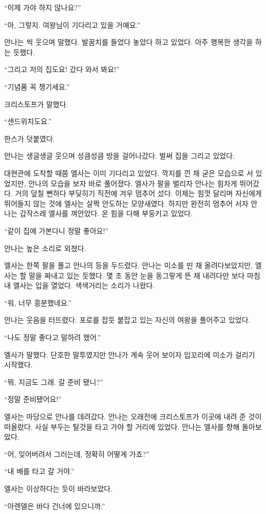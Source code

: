 ``이제 가야 하지 않나요?''

``아, 그렇지. 여왕님이 기다리고 있을 거예요.''

안나는 씩 웃으며 말했다. 발꿈치를 들었다 놓았다 하고 있었다. 아주 행복한 생각을 하는 듯했다.

``그리고 저의 집도요! 갔다 와서 봐요!''

``기념품 꼭 챙기세요.''

크리스토프가 말했다.

``샌드위치도요.''

한스가 덧붙였다.

안나는 생글생글 웃으며 성큼성큼 방을 걸어나갔다. 벌써 집을 그리고 있었다.

\textbreak

대현관에 도착할 때쯤 엘사는 이미 기다리고 있었다. 깍지를 낀 채 굳은 모습으로 서 있었지만, 안나의 모습을 보자 바로 풀어졌다. 엘사가 팔을 벌리자 안나는 힘차게 뛰어갔다. 거의 덮칠 뻔하다 부딪히기 직전에 겨우 멈추어 섰다. 이제는 힘껏 달리며 자신에게 뛰어들지 않는 것에 엘사는 살짝 안도하는 모양새였다. 하지만 완전히 멈추어 서자 안나는 갑작스레 엘사를 껴안았다. 온 힘을 다해 부둥키고 있었다.

``같이 집에 가본다니 정말 좋아요!''

안나는 높은 소리로 외쳤다.

엘사는 한쪽 팔을 풀고 안나의 등을 두드렸다. 안나는 미소를 띤 채 올려다보았지만, 엘사는 할 말을 짜내고 있는 듯했다. 몇 초 동안 눈을 동그랗게 뜬 채 내려다만 보다 마침내 엘사는 입을 열었다. 색색거리는 소리가 나왔다.

``워, 너무 흥분했네요.''

안나는 웃음을 터뜨렸다. 포로를 잡듯 붙잡고 있는 자신의 여왕을 풀어주고 있었다.

``나도 정말 좋다고 말하려 했어.''

엘사가 말했다. 단호한 말투였지만 안나가 계속 웃어 보이자 입꼬리에 미소가 걸리기 시작했다.

``뭐, 지금도 그래. 갈 준비 됐니?''

``정말 준비됐어요!''

엘사는 마당으로 안나를 데려갔다. 안나는 오래전에 크리스토프가 이곳에 내려 준 것이 떠올랐다. 사실 부두는 탈것을 타고 가야 할 거리에 있었다. 안나는 엘사를 향해 돌아보았다.

``어, 잊어버려서 그러는데, 정확히 어떻게 가죠?''

``내 배를 타고 갈 거야.''

엘사는 이상하다는 듯이 바라보았다.

``아렌델은 바다 건너에 있으니까.''

